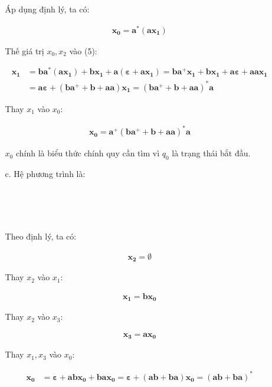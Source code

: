 \documentclass[12pt, a4paper]{article}
\begin{document}
\begin{itemize}
\begin{itemize}
				Áp dụng định lý, ta có: 
				
				\begin{align*}
				\bm{ x_0 = a^*(ax_1) }
				\end{align*}
				
				Thế giá trị $x_0, x_2$ vào (5):
				
				\begin{align*}
				\bm{ x_1 } &= \bm{ ba^*(ax_1) + bx_1 + a(\varepsilon + ax_1) = ba^+x_1 + bx_1 + a\varepsilon + aax_1 } \\
				&= \bm{ a\varepsilon + (ba^+ + b + aa)x_1  = (ba^+ + b + aa)^*a }
				\end{align*}
				
				Thay $x_1$ vào $x_0$:
				
				\begin{align*}
				\bm{ x_0 = a^+(ba^+ + b + aa)^*a }
				\end{align*}
				
				$x_0$ chính là biểu thức chính quy cần tìm vì $q_0$ là trạng thái bắt đầu.				
				
			\item[c.] Hệ phương trình là:
			
				\begin{numcases}{}
				 \\
				 \\
				 \\
				\end{numcases}
				
				Theo định lý, ta có:
				
				\begin{align*}
				\bm{ x_2 = \emptyset }
				\end{align*}
				
				Thay $x_2$ vào $x_1$:
				
				\begin{align*}
				\bm{ x_1 = bx_0 }
				\end{align*}
				
				Thay $x_2$ vào $x_3$:
				
				\begin{align*}
				\bm{ x_3 = ax_0 }
				\end{align*}
				
				Thay $x_1, x_3$ vào $x_0$:
				
				\begin{align*}
				\bm{ x_0 } &= \bm{ \varepsilon + abx_0 + bax_0 = \varepsilon + (ab + ba)x_0 = (ab + ba)^* }
				\end{align*}
				

\end{itemize}
\end{itemize}
\end{document}
